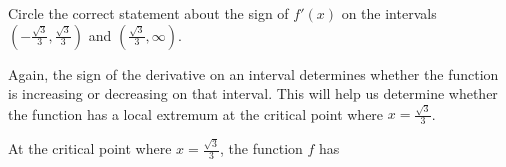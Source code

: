 \documentclass{ximera}
\begin{document}
\begin{example}
\begin{explanation}
\begin{question}
  \begin{multipleChoice}
           \end{multipleChoice}
  \end{question}
  \begin{question}
Circle the correct  statement about the sign of $f'(x)$ on the intervals  $(-\frac{\sqrt{3}}{3},\frac{\sqrt{3}}{3})$ and  $(\frac{\sqrt{3}}{3},\infty)$. \\
 
  \begin{multipleChoice}
  \end{multipleChoice}
  \end{question}
Again, the sign of the derivative on an interval determines whether the function is increasing or decreasing on that interval. This will help us determine whether the function has a local extremum at the critical point  where $x=\frac{\sqrt{3}}{3}$. \\
  \begin{question}

At the critical point where $x=\frac{\sqrt{3}}{3}$, the function $f$ has  \\
 

\end{question}
\end{explanation}
\end{example}
\end{document}
